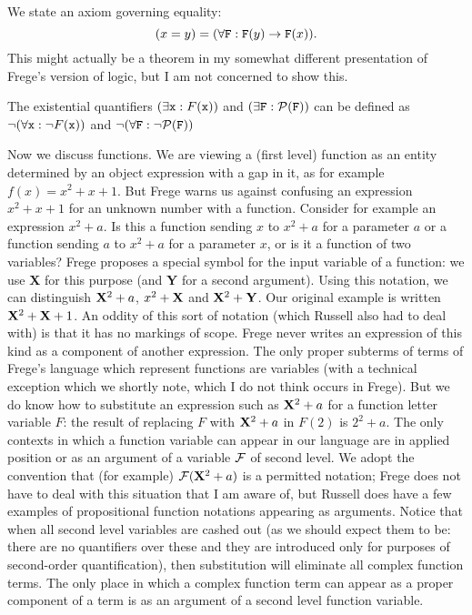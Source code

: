 \documentclass[12pt]{article}
\begin{document}
We state an axiom governing equality: $$(x=y) = (\forall {\tt F}:{\tt F}(y) \rightarrow {\tt F}(x)).$$  This might actually be a theorem in my somewhat different presentation of Frege's version of logic, but I am not concerned to show this.

The existential quantifiers $(\exists {\tt x}:F({\tt x}))$ and $(\exists{\tt  F}:{\cal P}({\tt F}))$ can be defined as $\neg (\forall  {\tt x}:\neg F({\tt x}))$ and $\neg (\forall{\tt  F}:\neg {\cal P}({\tt F}))$ 

Now we discuss functions.  We are viewing a (first level) function as an entity determined by an object expression with a gap in it, as for example $f(x)=x^2+x+1$.  But Frege warns us against confusing an expression $x^2+x+1$ for an unknown number with a function.  Consider for example an expression $x^2+a$.  Is this a function sending $x$ to $x^2+a$ for a parameter
$a$ or a function sending $a$ to $x^2+a$ for a parameter $x$, or is it a function of two variables?  Frege proposes a special symbol for the input variable of a function:  we use
{\bf X} for this purpose (and {\bf Y} for a second argument).  Using this notation, we can distinguish ${\bf X}^2 + a$, $x^2 + {\bf X}$ and ${\bf X}^2+{\bf Y}$.  Our original example is written ${\bf X}^2 + {\bf X}+1$.  An oddity of this sort of notation (which Russell also had to deal with) is that it has no markings of scope.  Frege never writes an expression of this kind as a component of another expression.  The only
proper subterms of terms of Frege's language which represent functions are variables (with a technical exception which we shortly note, which I do not think occurs in Frege).  But we do know how to substitute an expression such as ${\bf X}^2+a$ for a function letter variable $F$:  the result of replacing $F$ with ${\bf X}^2+a$ in $F(2)$ is $2^2+a$.  The only contexts in which a function variable can appear in our language are in applied position or as
an argument of a variable ${\cal F}$ of second level.  We adopt the convention that (for example) ${\cal F}({\bf X}^2 + a)$ is a permitted notation;  Frege does not have to deal with this situation that
I am aware of, but Russell does have a few examples of propositional function notations appearing as arguments.  Notice that when all second level variables are cashed out
(as we should expect them to be:  there are no quantifiers over these and they are introduced only for purposes of second-order quantification), then substitution will eliminate all complex function terms.  The only place in which a complex function term can appear as a proper component of a term is as an argument of a second level function variable.
\end{document}
